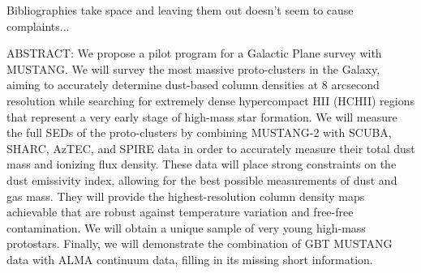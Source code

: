 \documentclass[11pt,preprint]{aastex_nofoot}
\begin{document}

\clearpage
{\color{red} Bibliographies take space and leaving them out doesn't seem to cause complaints...}
\footnotesize\raggedright
\noindent 
%

\normalsize
%


ABSTRACT:
We propose a pilot program for a Galactic Plane survey with MUSTANG.  We will
survey the most massive proto-clusters in the Galaxy, aiming to accurately
determine dust-based column densities at 8 arcsecond resolution while searching
for extremely dense hypercompact HII (HCHII) regions that represent a very
early stage of high-mass star formation.  We will measure the full SEDs of the
proto-clusters by combining MUSTANG-2 with SCUBA, SHARC, AzTEC, and SPIRE data in
order to accurately measure their total dust mass and ionizing flux
density. These data will place strong constraints on the dust emissivity index,
allowing for the best possible measurements of dust and gas mass. 
They will provide the highest-resolution column density maps achievable that
are robust against temperature variation and free-free contamination.
We will obtain a unique sample of very young high-mass protostars.  Finally,
we will demonstrate the combination of GBT MUSTANG data with ALMA continuum
data, filling in its missing short information.
\end{document}
